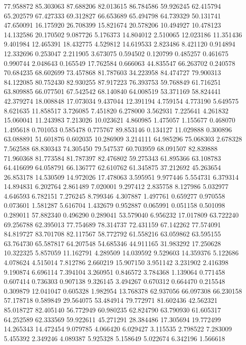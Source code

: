 77.958872
85.303063
87.688206
82.013615
86.784586
59.926245
62.415794
65.202579
67.427333
69.312827
66.653689
65.494798
64.739329
50.131741
47.650091
16.175920
26.708399
15.821674
20.578206
10.494927
10.478123
14.132586
20.170502
9.087726
5.176373
14.804012
2.510065
12.023186
11.351436
9.401984
12.465391
18.432775
4.529812
14.619533
2.823486
8.421120
0.914894
12.332696
0.253047
2.211905
3.673075
0.594502
0.120799
0.485257
0.461675
0.990744
2.048643
0.165549
17.762584
0.666063
44.835547
66.263702
0.240578
70.684235
68.602699
73.457868
81.787603
34.223958
84.474727
79.900313
84.122085
80.752430
82.930255
87.917223
76.393753
59.768849
61.716251
63.809885
66.077501
67.542542
68.140840
64.008519
53.371169
58.824441
42.379274
18.008848
17.073034
9.437044
12.391194
4.759154
4.773190
5.649575
8.621635
11.858517
3.726085
7.451820
6.278000
3.562931
7.225641
4.261832
15.060041
11.243983
7.213026
10.023621
4.860985
1.475057
1.155677
0.468070
1.495618
0.701053
0.585478
0.775767
89.853146
0.134127
11.029888
0.300896
63.088891
51.601876
0.602035
10.286909
3.214111
64.985296
75.068303
2.678328
7.562588
68.830343
74.305450
79.547537
60.703959
68.091507
82.839888
71.960368
81.773584
81.787397
82.476802
59.275343
61.895366
63.108783
64.416699
64.058791
66.136777
62.610762
61.345875
37.212692
45.263654
26.853178
14.530509
14.972026
17.478063
3.595951
9.977446
5.554731
6.379314
14.894831
6.202764
2.861489
7.020001
9.297412
2.835758
8.127986
5.032977
4.646593
6.782151
7.276245
8.799346
4.307887
1.497761
0.659277
0.970558
0.073601
1.581287
5.616704
1.432679
0.952887
0.065991
0.051158
0.501098
0.289011
57.882340
0.496290
0.289041
53.579040
6.956232
17.017809
63.722240
69.256788
62.395013
77.754689
78.314737
72.431159
67.142262
77.574091
84.819727
83.701708
82.117567
58.772792
61.558216
63.059862
63.595155
63.764730
65.587817
64.207548
54.685346
44.911165
31.983292
17.250628
10.322325
5.857059
11.162791
4.289509
14.039592
9.529603
14.359376
5.122686
4.078624
4.515014
7.812786
2.660219
15.907150
3.951142
3.231902
2.416398
9.190874
6.696114
7.394104
3.260951
0.846572
3.784368
1.139064
0.771458
0.607414
0.736303
0.907138
9.326145
3.494267
0.670312
0.664470
0.215548
0.309879
12.041047
0.605328
1.982954
13.768378
62.937056
66.097308
66.230158
57.178718
0.589849
29.564075
53.484914
79.772971
81.602436
42.562321
85.018727
82.405140
56.772949
60.980235
62.824790
63.790930
61.605317
64.252589
62.333569
59.922611
45.271291
28.384486
17.305694
19.772499
14.265343
14.472454
9.079785
4.066420
6.029427
3.115535
2.798522
7.283009
5.455392
2.349246
4.089387
5.925328
5.158649
5.022674
6.342196
1.566618
